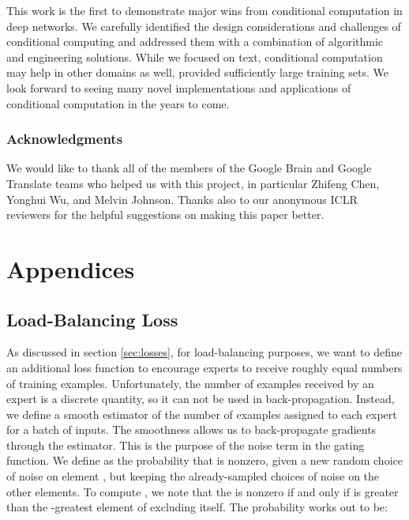 \documentclass{article} \pdfoutput=1
\begin{document}
This work is the first to demonstrate major wins from conditional computation in deep networks.  We carefully identified the design considerations and challenges of conditional computing and addressed them with a combination of algorithmic and engineering solutions. While we focused on text, conditional computation may help in other domains as well, provided sufficiently large training sets. We look forward to seeing many novel implementations and applications of conditional computation in the years to come.



\subsubsection*{Acknowledgments}
We would like to thank all of the members of the Google Brain and Google Translate teams who helped us with this project, in particular Zhifeng Chen, Yonghui Wu, and Melvin Johnson.  Thanks also to our anonymous ICLR reviewers for the helpful suggestions on making this paper better.





\newpage
\appendix
\section*{Appendices}
\renewcommand{\thesubsection}{\Alph{subsection}}

\subsection{Load-Balancing Loss} \label{sec:load}

As discussed in section \ref{sec:losses}, for load-balancing purposes, we want to define an additional loss function to encourage experts to receive roughly equal numbers of training examples.  Unfortunately, the number of examples received by an expert is a discrete quantity, so it can not be used in back-propagation.  Instead, we define a smooth estimator  of the number of examples assigned to each expert for a batch  of inputs.  The smoothness allows us to back-propagate gradients through the estimator.  This is the purpose of the noise term in the gating function.  We define  as the probability that  is nonzero, given a new random choice of noise on element , but keeping the already-sampled choices of noise on the other elements.  To compute , we note that the  is nonzero if and only if  is greater than the -greatest element of  excluding itself. The probability works out to be:
\end{document}

